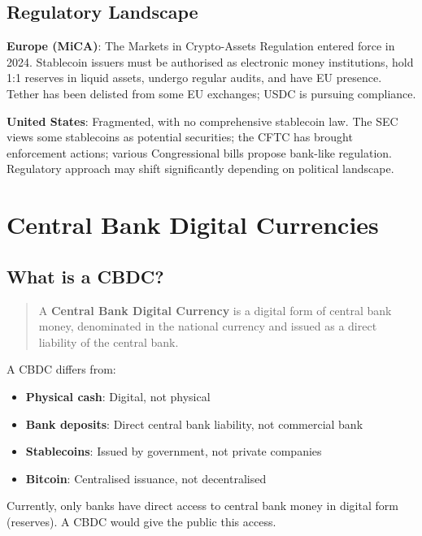 \documentclass[11pt,a4paper]{article}
\newcommand{\keyword}[1]{\textbf{\textcolor{AccentOrange}{#1}}}
\begin{document}
\subsection{Regulatory Landscape}

\textbf{Europe (MiCA)}: The Markets in Crypto-Assets Regulation entered force in 2024. Stablecoin issuers must be authorised as electronic money institutions, hold 1:1 reserves in liquid assets, undergo regular audits, and have EU presence. Tether has been delisted from some EU exchanges; USDC is pursuing compliance.

\textbf{United States}: Fragmented, with no comprehensive stablecoin law. The SEC views some stablecoins as potential securities; the CFTC has brought enforcement actions; various Congressional bills propose bank-like regulation. Regulatory approach may shift significantly depending on political landscape.

\section{Central Bank Digital Currencies}

\subsection{What is a CBDC?}

\begin{quote}
A \keyword{Central Bank Digital Currency} is a digital form of central bank money, denominated in the national currency and issued as a direct liability of the central bank.
\end{quote}

A CBDC differs from:
\begin{itemize}
    \item \textbf{Physical cash}: Digital, not physical
    \item \textbf{Bank deposits}: Direct central bank liability, not commercial bank
    \item \textbf{Stablecoins}: Issued by government, not private companies
    \item \textbf{Bitcoin}: Centralised issuance, not decentralised
\end{itemize}

Currently, only banks have direct access to central bank money in digital form (reserves). A CBDC would give the public this access.
\end{document}
